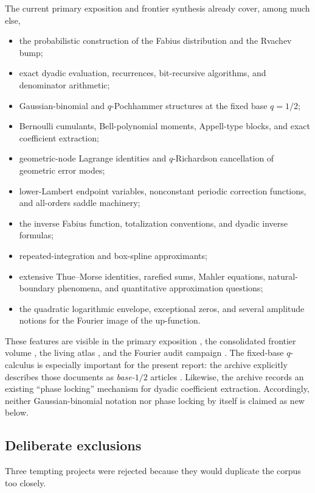 \documentclass[11pt]{article}
\numberwithin{equation}{section}
\theoremstyle{definition}
\theoremstyle{remark}
\begin{document}
The current primary exposition and frontier synthesis already cover, among much else,
\begin{itemize}
\item the probabilistic construction of the Fabius distribution and the Rvachev bump;
\item exact dyadic evaluation, recurrences, bit-recursive algorithms, and denominator
      arithmetic;
\item Gaussian-binomial and $q$-Pochhammer structures at the fixed base $q=1/2$;
\item Bernoulli cumulants, Bell-polynomial moments, Appell-type blocks, and exact coefficient
      extraction;
\item geometric-node Lagrange identities and $q$-Richardson cancellation of geometric error
      modes;
\item lower-Lambert endpoint variables, nonconstant periodic correction functions, and
      all-orders saddle machinery;
\item the inverse Fabius function, totalization conventions, and dyadic inverse formulas;
\item repeated-integration and box-spline approximants;
\item extensive Thue--Morse identities, rarefied sums, Mahler equations, natural-boundary
      phenomena, and quantitative approximation questions;
\item the quadratic logarithmic envelope, exceptional zeros, and several amplitude notions
      for the Fourier image of the up-function.
\end{itemize}
These features are visible in the primary exposition \cite{p10:proveitPrimary}, the consolidated
frontier volume \cite{p10:proveitFrontiers}, the living atlas \cite{p10:proveitAtlas}, and the
Fourier audit campaign \cite{p10:proveitFourierAudit}.  The fixed-base $q$-calculus is especially
important for the present report: the archive explicitly describes those documents as
\emph{base-$1/2$} articles \cite{p10:proveitArchive}.  Likewise, the archive records an existing
``phase locking'' mechanism for dyadic coefficient extraction.  Accordingly, neither
Gaussian-binomial notation nor phase locking by itself is claimed as new below.

\subsection{Deliberate exclusions}

Three tempting projects were rejected because they would duplicate the corpus too closely.
\end{document}
